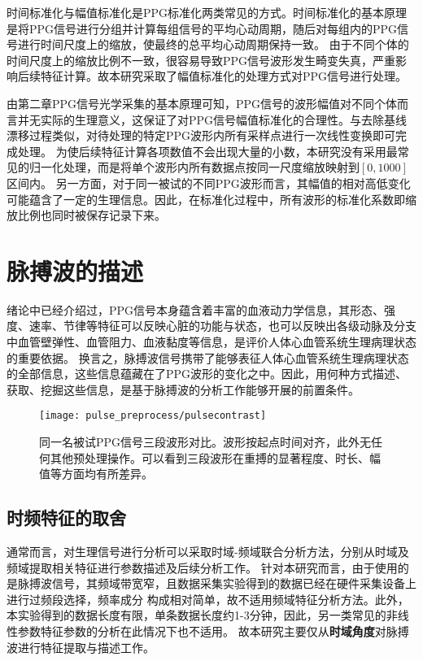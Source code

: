 时间标准化与幅值标准化是PPG标准化两类常见的方式\cite{mmt}。时间标准化的基本原理是将PPG信号进行分组并计算每组信号的平均心动周期，随后对每组内的PPG信号进行时间尺度上的缩放，使最终的总平均心动周期保持一致。
由于不同个体的时间尺度上的缩放比例不一致，很容易导致PPG信号波形发生畸变失真，严重影响后续特征计算。故本研究采取了幅值标准化的处理方式对PPG信号进行处理。

由第二章PPG信号光学采集的基本原理可知，PPG信号的波形幅值对不同个体而言并无实际的生理意义，这保证了对PPG信号幅值标准化的合理性。与去除基线漂移过程类似，对待处理的特定PPG波形内所有采样点进行一次线性变换即可完成处理。
为使后续特征计算各项数值不会出现大量的小数，本研究没有采用最常见的归一化处理，而是将单个波形内所有数据点按同一尺度缩放映射到$[0,1000]$区间内。
另一方面，对于同一被试的不同PPG波形而言，其幅值的相对高低变化可能蕴含了一定的生理信息。因此，在标准化过程中，所有波形的标准化系数即缩放比例也同时被保存记录下来。

\section{脉搏波的描述}
绪论中已经介绍过，PPG信号本身蕴含着丰富的血液动力学信息，其形态、强度、速率、节律等特征可以反映心脏的功能与状态，也可以反映出各级动脉及分支中血管壁弹性、血管阻力、血液黏度等信息，是评价人体心血管系统生理病理状态的重要依据\cite{PPGYY}。
换言之，脉搏波信号携带了能够表征人体心血管系统生理病理状态的全部信息，这些信息蕴藏在了PPG波形的变化之中。因此，用何种方式描述、获取、挖掘这些信息，是基于脉搏波的分析工作能够开展的前置条件。
\begin{figure}[htbp]
    \centering
    \texttt{[image: pulse\_preprocess/pulsecontrast]}
    \caption[同一名被试PPG信号三段波形对比]{\label{fig:pulsecontrast}同一名被试PPG信号三段波形对比。波形按起点时间对齐，此外无任何其他预处理操作。可以看到三段波形在重搏的显著程度、时长、幅值等方面均有所差异。}
\end{figure}
\subsection{时频特征的取舍}
通常而言，对生理信号进行分析可以采取时域-频域联合分析方法，分别从时域及频域提取相关特征进行参数描述及后续分析工作。
针对本研究而言，由于使用的是脉搏波信号，其频域带宽窄，且数据采集实验得到的数据已经在硬件采集设备上进行过频段选择，频率成分
构成相对简单，故不适用频域特征分析方法。此外，本实验得到的数据长度有限，单条数据长度约1-3分钟，因此，另一类常见的非线性参数特征参数的分析在此情况下也不适用。
故本研究主要仅从\textbf{时域角度}对脉搏波进行特征提取与描述工作。


